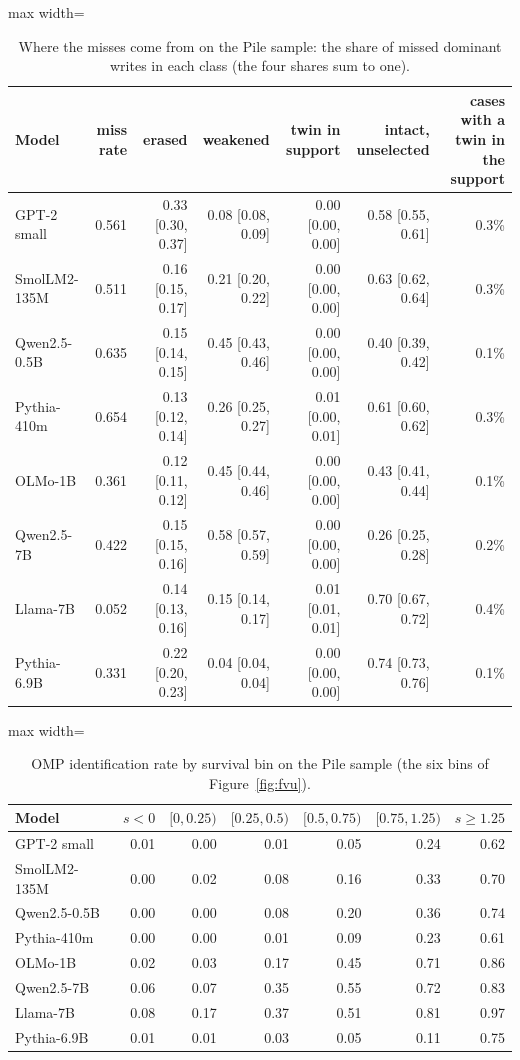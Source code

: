 \begin{table}[H]\centering\scriptsize
\caption{Where the misses come from on the Pile sample: the share of missed dominant writes in each class (the four shares sum to one).}\label{app:z3-miss-pile}
\begin{adjustbox}{max width=\linewidth}
\begin{tabular}{lrrrrrr}\toprule
Model & miss rate & erased & weakened & twin in support & intact, unselected & cases with a twin in the support \\ \midrule
GPT-2 small & 0.561 & 0.33 [0.30, 0.37] & 0.08 [0.08, 0.09] & 0.00 [0.00, 0.00] & 0.58 [0.55, 0.61] & 0.3\% \\
SmolLM2-135M & 0.511 & 0.16 [0.15, 0.17] & 0.21 [0.20, 0.22] & 0.00 [0.00, 0.00] & 0.63 [0.62, 0.64] & 0.3\% \\
Qwen2.5-0.5B & 0.635 & 0.15 [0.14, 0.15] & 0.45 [0.43, 0.46] & 0.00 [0.00, 0.00] & 0.40 [0.39, 0.42] & 0.1\% \\
Pythia-410m & 0.654 & 0.13 [0.12, 0.14] & 0.26 [0.25, 0.27] & 0.01 [0.00, 0.01] & 0.61 [0.60, 0.62] & 0.3\% \\
OLMo-1B & 0.361 & 0.12 [0.11, 0.12] & 0.45 [0.44, 0.46] & 0.00 [0.00, 0.00] & 0.43 [0.41, 0.44] & 0.1\% \\
Qwen2.5-7B & 0.422 & 0.15 [0.15, 0.16] & 0.58 [0.57, 0.59] & 0.00 [0.00, 0.00] & 0.26 [0.25, 0.28] & 0.2\% \\
Llama-7B & 0.052 & 0.14 [0.13, 0.16] & 0.15 [0.14, 0.17] & 0.01 [0.01, 0.01] & 0.70 [0.67, 0.72] & 0.4\% \\
Pythia-6.9B & 0.331 & 0.22 [0.20, 0.23] & 0.04 [0.04, 0.04] & 0.00 [0.00, 0.00] & 0.74 [0.73, 0.76] & 0.1\% \\
\bottomrule\end{tabular}\end{adjustbox}
\end{table}
\begin{table}[H]\centering\scriptsize
\caption{OMP identification rate by survival bin on the Pile sample (the six bins of Figure~\ref{fig:fvu}).}\label{app:z3-bins-pile}
\begin{adjustbox}{max width=\linewidth}
\begin{tabular}{lrrrrrr}\toprule
Model & $s<0$ & $[0,0.25)$ & $[0.25,0.5)$ & $[0.5,0.75)$ & $[0.75,1.25)$ & $s\ge1.25$ \\ \midrule
GPT-2 small & 0.01 & 0.00 & 0.01 & 0.05 & 0.24 & 0.62 \\
SmolLM2-135M & 0.00 & 0.02 & 0.08 & 0.16 & 0.33 & 0.70 \\
Qwen2.5-0.5B & 0.00 & 0.00 & 0.08 & 0.20 & 0.36 & 0.74 \\
Pythia-410m & 0.00 & 0.00 & 0.01 & 0.09 & 0.23 & 0.61 \\
OLMo-1B & 0.02 & 0.03 & 0.17 & 0.45 & 0.71 & 0.86 \\
Qwen2.5-7B & 0.06 & 0.07 & 0.35 & 0.55 & 0.72 & 0.83 \\
Llama-7B & 0.08 & 0.17 & 0.37 & 0.51 & 0.81 & 0.97 \\
Pythia-6.9B & 0.01 & 0.01 & 0.03 & 0.05 & 0.11 & 0.75 \\
\bottomrule\end{tabular}\end{adjustbox}
\end{table}
